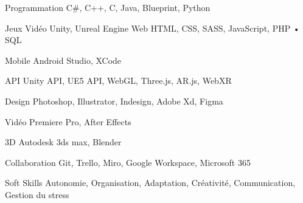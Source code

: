 



\begin{cvskills}


  \cvskill
    {Programmation} %
    {C\#, C++, C, Java, Blueprint, Python} %

    \cvskill
    {Jeux Vidéo} %
    {Unity, Unreal Engine}
  \cvskill
    {Web} %
    {HTML, CSS, SASS, JavaScript, PHP • SQL} %

    \cvskill
    {Mobile} %
    {Android Studio, XCode} %
    
    \cvskill
    {API} %
    {Unity API, UE5 API, WebGL, Three.js, AR.js, WebXR } %

    \cvskill
    {Design} %
    {Photoshop, Illustrator, Indesign, Adobe Xd, Figma} %

    \cvskill
    {Vidéo} %
    {Premiere Pro, After Effects} %

    \cvskill
    {3D} %
    {Autodesk 3ds max, Blender} %

    \cvskill
    {Collaboration} %
    {Git, Trello, Miro, Google Workspace, Microsoft 365} %

    
    
  \cvskill
    {Soft Skills} %
    {Autonomie, Organisation, Adaptation, Créativité, Communication, Gestion du stress} %

\end{cvskills}
